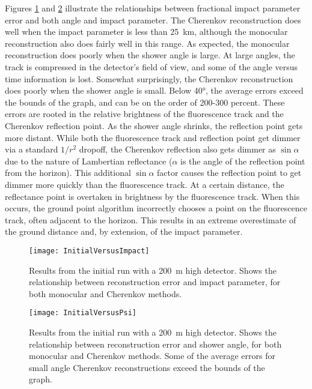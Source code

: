 Figures \ref{fig:error_vs_impact} and \ref{fig:error_vs_angle} illustrate the relationships between fractional impact parameter error and both angle and impact parameter. The Cherenkov reconstruction does well when the impact parameter is less than \SI{25}{km}, although the monocular reconstruction also does fairly well in this range. As expected, the monocular reconstruction does poorly when the shower angle is large. At large angles, the track is compressed in the detector's field of view, and some of the angle versus time information is lost. Somewhat surprisingly, the Cherenkov reconstruction does poorly when the shower angle is small. Below \ang{40}, the average errors exceed the bounds of the graph, and can be on the order of 200-300 percent. These errors are rooted in the relative brightness of the fluorescence track and the Cherenkov reflection point. As the shower angle shrinks, the reflection point gets more distant. While both the fluorescence track and reflection point get dimmer via a standard $1/r^2$ dropoff, the Cherenkov reflection also gets dimmer as $\sin{\alpha}$ due to the nature of Lambertian reflectance ($\alpha$ is the angle of the reflection point from the horizon). This additional $\sin{\alpha}$ factor causes the reflection point to get dimmer more quickly than the fluorescence track. At a certain distance, the reflectance point is overtaken in brightness by the fluorescence track. When this occurs, the ground point algorithm incorrectly chooses a point on the fluorescence track, often adjacent to the horizon. This results in an extreme overestimate of the ground distance and, by extension, of the impact parameter.

\begin{figure}[p]
    \label{fig:error_vs_impact}
    \centering
    \texttt{[image: InitialVersusImpact]}
    \caption{Results from the initial run with a \SI{200}{m} high detector. Shows the relationship between reconstruction error and impact parameter, for both monocular and Cherenkov methods.}
\end{figure}

\begin{figure}[p]
    \label{fig:error_vs_angle}
    \centering
    \texttt{[image: InitialVersusPsi]}
    \caption{Results from the initial run with a \SI{200}{m} high detector. Shows the relationship between reconstruction error and shower angle, for both monocular and Cherenkov methods. Some of the average errors for small angle Cherenkov reconstructions exceed the bounds of the graph.}
\end{figure}

